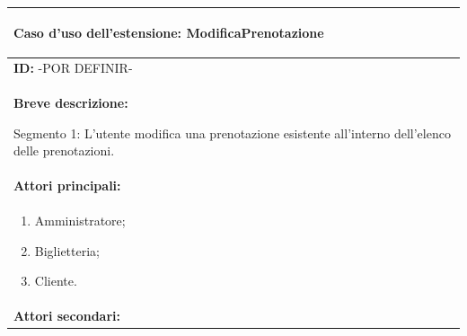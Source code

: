 \documentclass{article}
\begin{document}
                \begin{table}[t]
                    \centering
                    \begin{tabular}{|p{\linewidth}|}
                        \hline
                        \cellcolor{gray!100}
                        \color{white}
                        \begin{center}
                            \textbf{Caso d'uso dell'estensione:} ModificaPrenotazione
                        \end{center} \\
                        \hline
                        \textbf{ID:} -POR DEFINIR- \\
                        \hline
                        \cellcolor{gray!20}
                        \textbf{Breve descrizione:}
                        
                        Segmento 1: L'utente modifica una prenotazione esistente all'interno dell'elenco delle prenotazioni. \\
                        \hline
                        \textbf{Attori principali:} \\
                        \begin{minipage}{\linewidth}
                            \begin{enumerate}[noitemsep]
                                \item Amministratore;
                                \item Biglietteria;
                                \item Cliente. %
                            \end{enumerate}
                        \end{minipage}
                        \vspace{0pt} \\
                        \hline
                        \textbf{Attori secondari:}
                        

\end{tabular}
\end{table}
\end{document}
